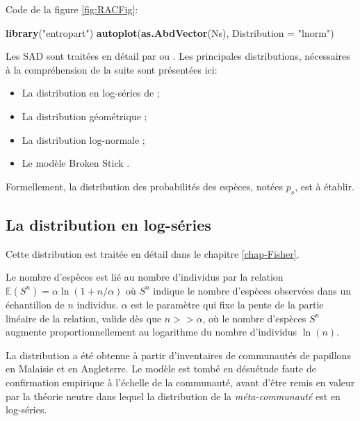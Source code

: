 \documentclass[
  11pt,
  french,
  a4paper,
  extrafontsizes,onecolumn,openright
  ]{memoir}
\newenvironment{Shaded}{\begin{snugshade}}{\end{snugshade}}
\newcommand{\DataTypeTok}[1]{\textcolor[rgb]{0.13,0.29,0.53}{#1}}
\newcommand{\KeywordTok}[1]{\textcolor[rgb]{0.13,0.29,0.53}{\textbf{#1}}}
\newcommand{\NormalTok}[1]{#1}
\newcommand{\StringTok}[1]{\textcolor[rgb]{0.31,0.60,0.02}{#1}}
\providecommand{\tightlist}{%
  \setlength{\itemsep}{0pt}\setlength{\parskip}{0pt}}
\begin{document}
\normalsize

Code de la figure \ref{fig:RACFig}:

\scriptsize

\begin{Shaded}
\begin{Highlighting}[]
\KeywordTok{library}\NormalTok{(}\StringTok{"entropart"}\NormalTok{)}
\KeywordTok{autoplot}\NormalTok{(}\KeywordTok{as.AbdVector}\NormalTok{(Ns), }\DataTypeTok{Distribution =} \StringTok{"lnorm"}\NormalTok{)}
\end{Highlighting}
\end{Shaded}

\normalsize

Les SAD sont traitées en détail par \textcite{Magurran1988} ou \textcite{McGill2007}.
Les principales distributions, nécessaires à la compréhension de la suite sont présentées ici:

\begin{itemize}
\tightlist
\item
  La distribution en log-séries de \textcite{Fisher1943};
\item
  La distribution géométrique \autocite{Motomura1932,Whittaker1972};
\item
  La distribution log-normale \autocite{Preston1948};
\item
  Le modèle Broken Stick \autocite{MacArthur1957}.
\end{itemize}

Formellement, la distribution des probabilités des espèces, notées \(p_s\), est à établir.

\hypertarget{la-distribution-en-log-suxe9ries}{%
\subsection{La distribution en log-séries}\label{la-distribution-en-log-suxe9ries}}

Cette distribution est traitée en détail dans le chapitre \ref{chap-Fisher}.

Le nombre d'espèces est lié au nombre d'individus par la relation \({\mathbb E}(S^n)=\alpha\ln(1+n/\alpha)\) où \(S^n\) indique le nombre d'espèces observées dans un échantillon de \(n\) individus.
\(\alpha\) est le paramètre qui fixe la pente de la partie linéaire de la relation, valide dès que \(n>>\alpha\), où le nombre d'espèces \(S^n\) augmente proportionnellement au logarithme du nombre d'individus \(\ln(n)\).

La distribution a été obtenue à partir d'inventaires de communautés de papillons en Malaisie et en Angleterre.
Le modèle est tombé en désuétude faute de confirmation empirique à l'échelle de la communauté, avant d'être remis en valeur par la théorie neutre \autocite{Hubbell2001} dans lequel la distribution de la \emph{méta-communauté} est en log-séries.
\end{document}
